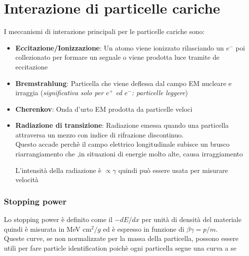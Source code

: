 \section{Interazione di particelle cariche}
I meccanismi di interazione principali per le particelle cariche sono:
\begin{itemize}

    \item \textbf{Eccitazione/Ionizzazione}: Un atomo viene ionizzato rilasciando un $e^-$ poi collezionato per formare un segnale o viene prodotta luce tramite de eccitazione

    \item \textbf{Bremstrahlung}: Particella che viene deflessa dal campo EM nucleare e irraggia (\textit{significativa solo per $e^+$ ed $e^{-}$: particelle leggere})

    \item \textbf{Cherenkov}: Onda d'urto EM prodotta da particelle veloci

    \item \textbf{Radiazione di transizione}: Radiazione emessa quando una particella attraversa un mezzo con indice di rifrazione discontinuo. \\
    Questo accade perchè il campo elettrico longitudinale subisce un brusco riarrangiamento che ,in situazioni di energie molto alte, causa irraggiamento

    L'intensità della radiazione è $\propto \gamma$ quindi può essere usata per misurare velocità

\end{itemize}
    \subsubsection*{Stopping power}
        Lo stopping power è definito come il $-dE/dx$ per unità di densità del materiale quindi è misurata in MeV cm$^2/g$  ed è espresso in funzione di $\beta \gamma=p/m$.
        \\
        Queste curve, se non normalizzate per la massa della particella, possono essere utili per fare particle identification poichè ogni particella segue una curva a se

